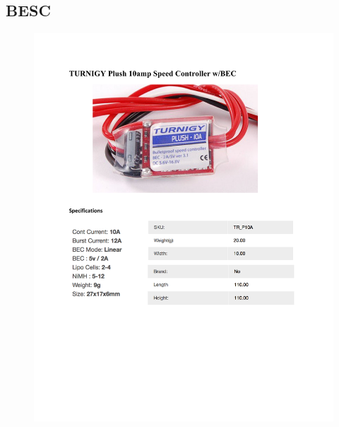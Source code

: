 \documentclass[../main.tex]{subfiles}
\begin{document}
\subsection{BESC \cite{BESC}} \label{BESC}
\begin{figure}[H]
	\centering
	\includegraphics[width=\textwidth]{img/specs/besc_thruster.pdf}
\end{figure}





\end{document}

